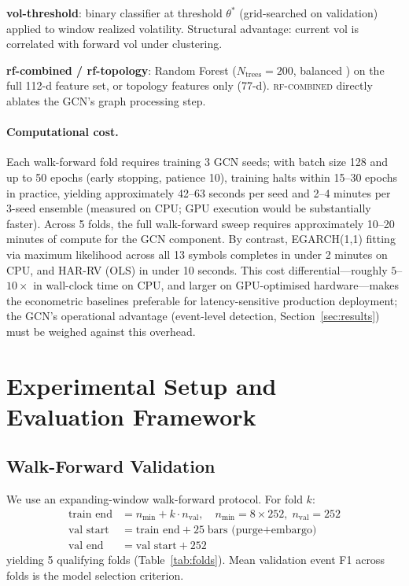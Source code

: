 \documentclass[sigconf]{acmart}
\begin{document}
\textbf{vol-threshold}: binary classifier at threshold $\theta^*$ (grid-searched
on validation) applied to window realized volatility. Structural advantage:
current vol is correlated with forward vol under clustering.

\textbf{rf-combined / rf-topology}: Random Forest ($N_\mathrm{trees}{=}200$,
balanced \citealt{breiman2001}) on the full 112-d feature set, or topology
features only (77-d). \textsc{rf-combined} directly ablates the GCN's graph
processing step.

\paragraph{Computational cost.}
Each walk-forward fold requires training 3 GCN seeds; with batch size 128 and up to
50 epochs (early stopping, patience 10), training halts within 15--30 epochs in
practice, yielding approximately 42--63 seconds per seed and 2--4 minutes per
3-seed ensemble (measured on CPU; GPU execution would be substantially faster).
Across 5 folds, the full walk-forward sweep requires approximately 10--20 minutes
of compute for the GCN component.
By contrast, EGARCH(1,1) fitting via maximum likelihood across all 13 symbols
completes in under 2 minutes on CPU, and HAR-RV (OLS) in under 10 seconds.
This cost differential---roughly $5$--$10\times$ in wall-clock time on CPU,
and larger on GPU-optimised hardware---makes the econometric baselines preferable
for latency-sensitive production deployment; the GCN's operational advantage
(event-level detection, Section~\ref{sec:results}) must be weighed against
this overhead.

\section{Experimental Setup and Evaluation Framework}

\subsection{Walk-Forward Validation}
\label{sec:walkforward}

We use an expanding-window walk-forward protocol. For fold $k$:
%
\begin{align}
\text{train end} &= n_\mathrm{min} + k \cdot n_\mathrm{val},\quad
  n_\mathrm{min} = 8 \times 252,\; n_\mathrm{val} = 252 \\
\text{val start} &= \text{train end} + 25\;\text{bars (purge+embargo)} \\
\text{val end}   &= \text{val start} + 252
\end{align}
%
yielding 5 qualifying folds (Table~\ref{tab:folds}). Mean validation event F1
across folds is the model selection criterion.
\end{document}
